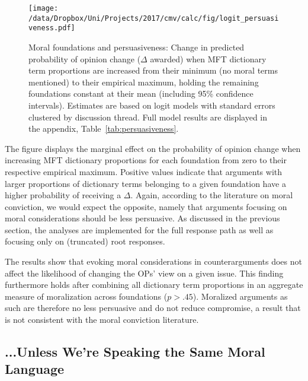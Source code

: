 \begin{figure}[ht]
\centering
\texttt{[image: /data/Dropbox/Uni/Projects/2017/cmv/calc/fig/logit\_persuasiveness.pdf]}
\caption[Moral foundations and persuasiveness]{Moral foundations and persuasiveness: Change in predicted probability of opinion change ($\Delta$ awarded) when MFT dictionary term proportions are increased from their minimum (no moral terms mentioned) to their empirical maximum, holding the remaining foundations constant at their mean (including 95\% confidence intervals). Estimates are based on logit models with standard errors clustered by discussion thread. Full model results are displayed in the appendix, Table~\ref{tab:persuasiveness}.}\label{fig:persuasiveness}
\end{figure}

The figure displays the marginal effect on the probability of opinion change when increasing MFT dictionary proportions for each foundation from zero to their respective empirical maximum. Positive values indicate that arguments with larger proportions of dictionary terms belonging to a given foundation have a higher probability of receiving a $\Delta$. Again, according to the literature on moral conviction, we would expect the opposite, namely that arguments focusing on moral considerations should be less persuasive. As discussed in the previous section, the analyses are implemented for the full response path as well as focusing only on (truncated) root responses.

The results show that evoking moral considerations in counterarguments does not affect the likelihood of changing the OPs' view on a given issue. This finding furthermore holds after combining all dictionary term proportions in an aggregate measure of moralization across foundations ($p > .45$). Moralized arguments as such are therefore no less persuasive and do not reduce compromise, a result that is not consistent with the moral conviction literature.



\subsection{...Unless We're Speaking the Same Moral Language}


